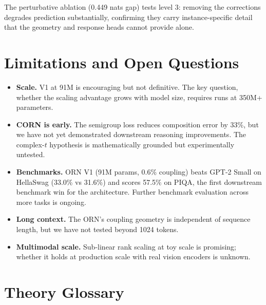 \documentclass[11pt, a4paper]{article}
\theoremstyle{plain}
\theoremstyle{remark}
\begin{document}
The perturbative ablation (0.449 nats gap) tests level 3: removing the corrections degrades prediction substantially, confirming they carry instance-specific detail that the geometry and response heads cannot provide alone.

\section{Limitations and Open Questions}

\begin{itemize}[nosep]
    \item \textbf{Scale.} V1 at 91M is encouraging but not definitive.
    The key question, whether the scaling advantage grows with model size, requires runs at 350M+ parameters.
    \item \textbf{CORN is early.} The semigroup loss reduces composition error by 33\%, but we have not yet demonstrated downstream reasoning improvements.
    The complex-$t$ hypothesis is mathematically grounded but experimentally untested.
    \item \textbf{Benchmarks.} ORN V1 (91M params, 0.6\% coupling) beats GPT-2 Small on HellaSwag (33.0\% vs 31.6\%) and scores 57.5\% on PIQA, the first downstream benchmark win for the architecture.
    Further benchmark evaluation across more tasks is ongoing.
    \item \textbf{Long context.} The ORN's coupling geometry is independent of sequence length, but we have not tested beyond 1024 tokens.
    \item \textbf{Multimodal scale.} Sub-linear rank scaling at toy scale is promising; whether it holds at production scale with real vision encoders is unknown.
\end{itemize}

\section{Theory Glossary}
\end{document}
